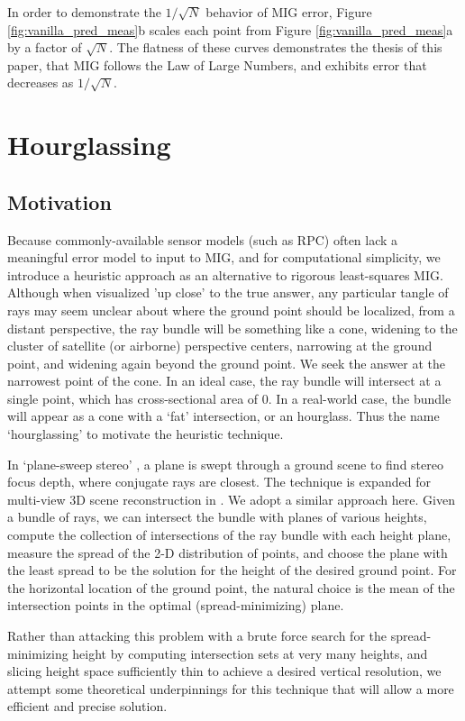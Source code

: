 \documentclass[10pt]{amsart}
\begin{document}
In order to demonstrate the $1/\sqrt{N}$ behavior of MIG error, Figure
\ref{fig:vanilla_pred_meas}b scales each point from Figure
\ref{fig:vanilla_pred_meas}a by a factor of $\sqrt N$. The flatness of these
curves demonstrates the thesis of this paper, that MIG follows the Law of Large
Numbers, and exhibits error that decreases as $1/\sqrt N$.




\section{Hourglassing\label{hourglassing}}
\subsection{Motivation}
Because commonly-available sensor models (such as RPC) often lack a meaningful
error model to input to MIG, and for computational simplicity, we introduce a
heuristic approach as an alternative to rigorous least-squares MIG. Although
when visualized 'up close' to the true answer, any particular tangle of rays may
seem unclear about where the ground point should be localized, from a distant
perspective, the ray bundle will be something like a cone, widening to the
cluster of satellite (or airborne) perspective centers, narrowing at the ground
point, and widening again beyond the ground point. We seek the answer at the
narrowest point of the cone. In an ideal case, the ray bundle will intersect at
a single point, which has cross-sectional area of 0. In a real-world case, the
bundle will appear as a cone with a `fat' intersection, or an hourglass. Thus
the name `hourglassing' to motivate the heuristic technique.

In `plane-sweep stereo' \cite{PLANE_SWEEP}, a plane is swept through a ground
scene to find stereo focus depth, where conjugate rays are closest. The
technique is expanded for multi-view 3D scene reconstruction in
\cite{PLANE_COLLINS}. We adopt a similar approach here. Given a bundle of rays,
we can intersect the bundle with planes of various heights, compute the
collection of intersections of the ray bundle with each height plane, measure
the spread of the 2-D distribution of points, and choose the plane with the
least spread to be the solution for the height of the desired ground point. For
the horizontal location of the ground point, the natural choice is the mean of
the intersection points in the optimal (spread-minimizing) plane.

Rather than attacking this problem with a brute force search for the
spread-minimizing height by computing intersection sets at very many heights,
and slicing height space sufficiently thin to achieve a desired vertical
resolution, we attempt some theoretical underpinnings for this technique that
will allow a more efficient and precise solution.
\end{document}
